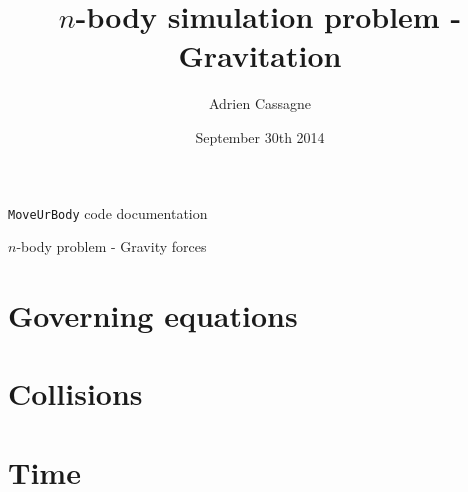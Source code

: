 \documentclass[a4paper,11pt,answers,11pt]{paper}
\title{$n$-body simulation problem - Gravitation}
\author{Adrien Cassagne}
\date{September 30th 2014}
\begin{document}
\begin{title}
	\noindent\makebox[\textwidth][c]{
	}
	\noindent{}
\begin{center}
	{\Large{\texttt{MoveUrBody} code documentation}}\\
\end{center}
\begin{center}
	{\footnotesize{$n$-body problem - Gravity forces}}
\end{center}
\end{title}

\setcounter{page}{1}
\section {Governing equations}


\section {Collisions}


\newpage
\section {Time}


%

%
\end{document}
